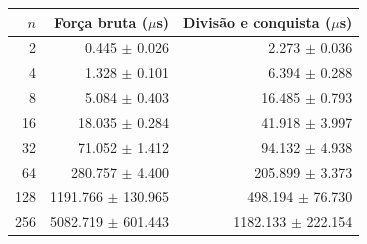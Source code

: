 \begin{tabular}{rrr}
\hline
$n$ & Força bruta ($\mu$s) & Divisão e conquista ($\mu$s) \\
\hline
2 & 0.445 $\pm$ 0.026 & 2.273 $\pm$ 0.036 \\
4 & 1.328 $\pm$ 0.101 & 6.394 $\pm$ 0.288 \\
8 & 5.084 $\pm$ 0.403 & 16.485 $\pm$ 0.793 \\
16 & 18.035 $\pm$ 0.284 & 41.918 $\pm$ 3.997 \\
32 & 71.052 $\pm$ 1.412 & 94.132 $\pm$ 4.938 \\
64 & 280.757 $\pm$ 4.400 & 205.899 $\pm$ 3.373 \\
128 & 1191.766 $\pm$ 130.965 & 498.194 $\pm$ 76.730 \\
256 & 5082.719 $\pm$ 601.443 & 1182.133 $\pm$ 222.154 \\
\hline
\end{tabular}
